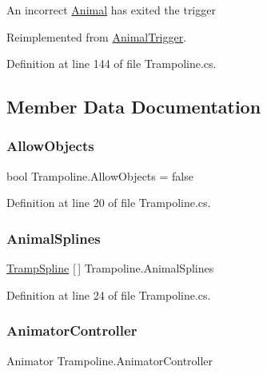 An incorrect \mbox{\hyperlink{class_animal}{Animal}} has exited the trigger 



Reimplemented from \mbox{\hyperlink{class_animal_trigger_abbdf7b21fc9595ff639b96e6baecec46}{Animal\+Trigger}}.



Definition at line 144 of file Trampoline.\+cs.



\subsection{Member Data Documentation}
\mbox{\label{class_trampoline_a7b13a227faf77c125abec786dd7d8e9c}} 
\subsubsection{\texorpdfstring{Allow\+Objects}{AllowObjects}}
{\footnotesize\ttfamily bool Trampoline.\+Allow\+Objects = false}



Definition at line 20 of file Trampoline.\+cs.

\mbox{\label{class_trampoline_abe1760bab2cdc68d0e77d44c952879fa}} 
\subsubsection{\texorpdfstring{Animal\+Splines}{AnimalSplines}}
{\footnotesize\ttfamily \mbox{\hyperlink{class_trampoline_1_1_tramp_spline}{Tramp\+Spline}} \mbox{[}$\,$\mbox{]} Trampoline.\+Animal\+Splines}



Definition at line 24 of file Trampoline.\+cs.

\mbox{\label{class_trampoline_aa9187792ca436af65cca3180da945c8b}} 
\subsubsection{\texorpdfstring{Animator\+Controller}{AnimatorController}}
{\footnotesize\ttfamily Animator Trampoline.\+Animator\+Controller}



